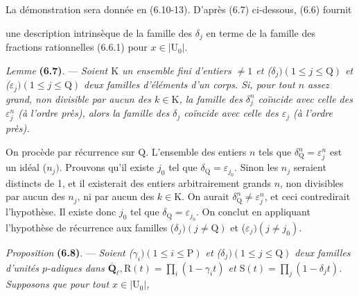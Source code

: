 \documentclass[10pt,leqno]{article}
\begin{document}
\par

\noindent La démonstration sera donnée en (6.10-13). D’après (6.7) ci-dessous, (6.6) fournit\par

\clearpage

\label{physical-26}\par\smallskip

\noindent une description intrinsèque de la famille des \(\delta _{j}\) en terme de la famille des fractions rationnelles (6.6.1) pour \(x\in |\mathrm{U}_{0}|\).\par

\noindent \emph{Lemme} \textbf{(6.7)}. — {\itshape Soient \(\mathrm{K}\) un ensemble fini d’entiers \(\ne 1\) et (\(\delta _{j}) (1\leq j\leq \mathrm{Q})\) et (\(\varepsilon _{j}) (1\leq j\leq \mathrm{Q})\) deux familles d’éléments d’un corps. Si, pour tout \(n\) assez grand, non divisible par aucun des \(k\in \mathrm{K}\), la famille des \(\delta _{j}^{n}\) coïncide avec celle des \(\varepsilon _{j}^{n}\) (à l’ordre près), alors la famille des \(\delta _{j}\) coïncide avec celle des \(\varepsilon _{j}\) (à l’ordre près).}\par

\noindent On procède par récurrence sur \(\mathrm{Q}\). L’ensemble des entiers \(n\) tels que \(\delta _{\mathrm{Q}}^{n}=\varepsilon _{j}^{n}\) est un idéal (\(n_{j})\). Prouvons qu’il existe \(j_{0}\) tel que \(\delta _{\mathrm{Q}}=\varepsilon _{j_{0}}\). Sinon les \(n_{j}\) seraient distincts de 1, et il existerait des entiers arbitrairement grands \(n\), non divisibles par aucun des \(n_{j}\), ni par aucun des \(k\in \mathrm{K}\). On aurait \(\delta _{\mathrm{Q}}^{n}\ne \varepsilon _{j}^{n}\), et ceci contredirait l’hypothèse. Il existe donc \(j_{0}\) tel que \(\delta _{\mathrm{Q}}=\varepsilon _{j_{0}}\). On conclut en appliquant l’hypothèse de récurrence aux familles (\(\delta _{j}) (j\ne \mathrm{Q})\) et (\(\varepsilon _{j}) (j\ne j_{0})\).\par

\noindent \emph{Proposition} \textbf{(6.8)}. — {\itshape Soient (\(\gamma _{i}) (1\leq i\leq \mathrm{P})\) et (\(\delta _{j}) (1\leq j\leq \mathrm{Q})\) deux familles d’unités \(p\)-adiques dans \(\overline{\mathbf{Q}}_{\ell }, \mathrm{R}(t)=\prod _{i}(1- \gamma _{i} t)\) et \(\mathrm{S}(t)=\prod _{j}(1- \delta _{j} t)\). Supposons que pour tout \(x\in |\mathrm{U}_{0}|\),}\par
\end{document}
